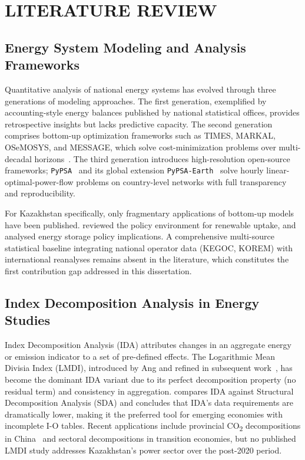 
\chapter{LITERATURE REVIEW}
\label{ch:litreview}

\section{Energy System Modeling and Analysis Frameworks}
\label{sec:lit_modeling}

Quantitative analysis of national energy systems has evolved through three generations of modeling approaches. The first generation, exemplified by accounting-style energy balances published by national statistical offices, provides retrospective insights but lacks predictive capacity. The second generation comprises bottom-up optimization frameworks such as TIMES, MARKAL, OSeMOSYS, and MESSAGE, which solve cost-minimization problems over multi-decadal horizons~\cite{ringkjob2018, prina2020}. The third generation introduces high-resolution open-source frameworks; \texttt{PyPSA}~\cite{brown2018pypsa} and its global extension \texttt{PyPSA-Earth}~\cite{parzen2023} solve hourly linear-optimal-power-flow problems on country-level networks with full transparency and reproducibility.

For Kazakhstan specifically, only fragmentary applications of bottom-up models have been published. \cite{karatayev2017} reviewed the policy environment for renewable uptake, and \cite{boute2019} analysed energy storage policy implications. A comprehensive multi-source statistical baseline integrating national operator data (KEGOC, KOREM) with international reanalyses remains absent in the literature, which constitutes the first contribution gap addressed in this dissertation.

\section{Index Decomposition Analysis in Energy Studies}
\label{sec:lit_lmdi}

Index Decomposition Analysis (IDA) attributes changes in an aggregate energy or emission indicator to a set of pre-defined effects. The Logarithmic Mean Divisia Index (LMDI), introduced by Ang and refined in subsequent work~\cite{ang2005, ang2015}, has become the dominant IDA variant due to its perfect decomposition property (no residual term) and consistency in aggregation. \cite{wang2017} compares IDA against Structural Decomposition Analysis (SDA) and concludes that IDA's data requirements are dramatically lower, making it the preferred tool for emerging economies with incomplete I-O tables. Recent applications include provincial CO\textsubscript{2} decompositions in China~\cite{liu2020} and sectoral decompositions in transition economies, but no published LMDI study addresses Kazakhstan's power sector over the post-2020 period.

